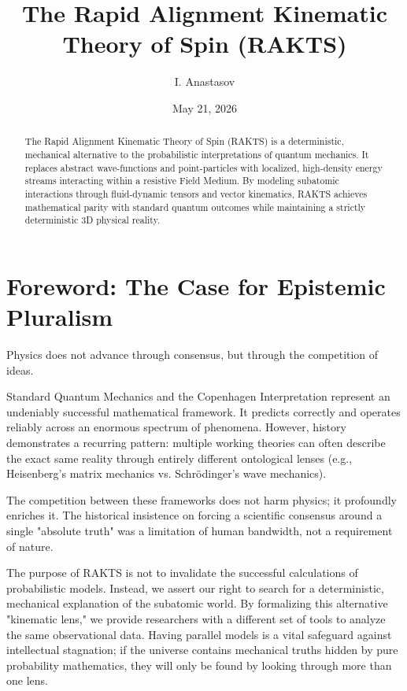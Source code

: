 \documentclass[reprint,amsmath,amssymb,aps,prd,twocolumn]{revtex4-2}
\begin{document}
\title{The Rapid Alignment Kinematic Theory of Spin (RAKTS)}
\author{I. Anastasov \texorpdfstring{\href{https://github.com/rt20bg/Anastasov_Theory}{\faGithub}}{}}
\date{May 21, 2026}

\begin{abstract}
The Rapid Alignment Kinematic Theory of Spin (RAKTS) is a deterministic, mechanical alternative to the probabilistic interpretations of quantum mechanics. It replaces abstract wave-functions and point-particles with localized, high-density energy streams interacting within a resistive Field Medium. By modeling subatomic interactions through fluid-dynamic tensors and vector kinematics, RAKTS achieves mathematical parity with standard quantum outcomes while maintaining a strictly deterministic 3D physical reality.
\end{abstract}

\maketitle

\section{Foreword: The Case for Epistemic Pluralism}
Physics does not advance through consensus, but through the competition of ideas.

Standard Quantum Mechanics and the Copenhagen Interpretation represent an undeniably successful mathematical framework. It predicts correctly and operates reliably across an enormous spectrum of phenomena. However, history demonstrates a recurring pattern: multiple working theories can often describe the exact same reality through entirely different ontological lenses (e.g., Heisenberg’s matrix mechanics vs. Schrödinger’s wave mechanics). 

The competition between these frameworks does not harm physics; it profoundly enriches it. The historical insistence on forcing a scientific consensus around a single "absolute truth" was a limitation of human bandwidth, not a requirement of nature.

The purpose of RAKTS is not to invalidate the successful calculations of probabilistic models. Instead, we assert our right to search for a deterministic, mechanical explanation of the subatomic world. By formalizing this alternative "kinematic lens," we provide researchers with a different set of tools to analyze the same observational data. Having parallel models is a vital safeguard against intellectual stagnation; if the universe contains mechanical truths hidden by pure probability mathematics, they will only be found by looking through more than one lens.
\end{document}

